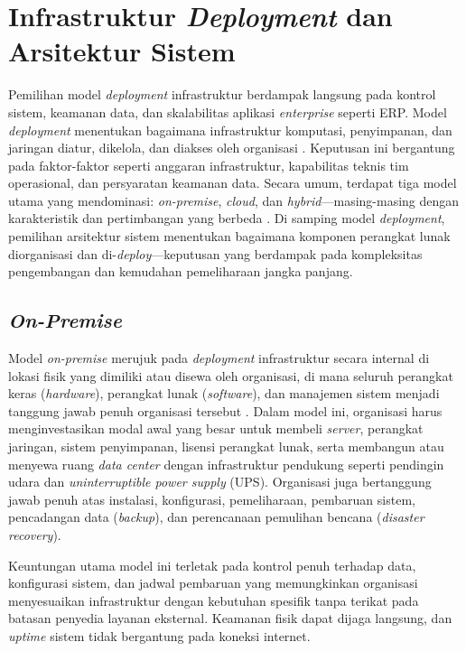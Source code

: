 \section{Infrastruktur \textit{Deployment} dan Arsitektur Sistem}

Pemilihan model \textit{deployment} infrastruktur berdampak langsung pada kontrol sistem, keamanan data, dan skalabilitas aplikasi \textit{enterprise} seperti ERP. Model \textit{deployment} menentukan bagaimana infrastruktur komputasi, penyimpanan, dan jaringan diatur, dikelola, dan diakses oleh organisasi \cite{Younus2024}. Keputusan ini bergantung pada faktor-faktor seperti anggaran infrastruktur, kapabilitas teknis tim operasional, dan persyaratan keamanan data. Secara umum, terdapat tiga model utama yang mendominasi: \textit{on-premise}, \textit{cloud}, dan \textit{hybrid}—masing-masing dengan karakteristik dan pertimbangan yang berbeda \cite{odunayo2018cloud}. Di samping model \textit{deployment}, pemilihan arsitektur sistem menentukan bagaimana komponen perangkat lunak diorganisasi dan di-\textit{deploy}—keputusan yang berdampak pada kompleksitas pengembangan dan kemudahan pemeliharaan jangka panjang.

\subsection{\textit{On-Premise}}

Model \textit{on-premise} merujuk pada \textit{deployment} infrastruktur secara internal di lokasi fisik yang dimiliki atau disewa oleh organisasi, di mana seluruh perangkat keras (\textit{hardware}), perangkat lunak (\textit{software}), dan manajemen sistem menjadi tanggung jawab penuh organisasi tersebut \cite{Younus2024}. Dalam model ini, organisasi harus menginvestasikan modal awal yang besar untuk membeli \textit{server}, perangkat jaringan, sistem penyimpanan, lisensi perangkat lunak, serta membangun atau menyewa ruang \textit{data center} dengan infrastruktur pendukung seperti pendingin udara dan \textit{uninterruptible power supply} (UPS). Organisasi juga bertanggung jawab penuh atas instalasi, konfigurasi, pemeliharaan, pembaruan sistem, pencadangan data (\textit{backup}), dan perencanaan pemulihan bencana (\textit{disaster recovery}).

Keuntungan utama model ini terletak pada kontrol penuh terhadap data, konfigurasi sistem, dan jadwal pembaruan yang memungkinkan organisasi menyesuaikan infrastruktur dengan kebutuhan spesifik tanpa terikat pada batasan penyedia layanan eksternal. Keamanan fisik dapat dijaga langsung, dan \textit{uptime} sistem tidak bergantung pada koneksi internet.

